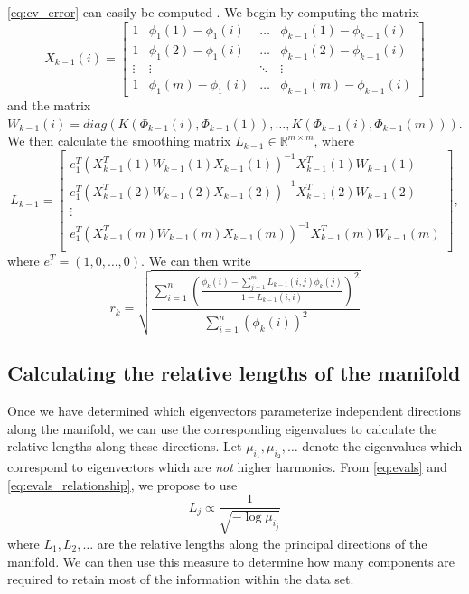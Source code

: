 \documentclass[preprint]{elsarticle}
\begin{document}
\eqref{eq:cv_error} can easily be computed \cite{wasserman2006all}.
%
We begin by computing the matrix
\begin{equation}
X_{k-1}(i) = \begin{bmatrix}
1 & \phi_1(1) - \phi_1(i) & \dots & \phi_{k-1}(1)- \phi_{k-1}(i) \\
1 & \phi_1(2) - \phi_1(i) & \dots & \phi_{k-1}(2)- \phi_{k-1}(i) \\
\vdots & \vdots & \ddots & \vdots \\
1 & \phi_1(m) - \phi_1(i) & \dots & \phi_{k-1}(m)- \phi_{k-1}(i) 
\end{bmatrix}
\end{equation}
%
and the matrix $W_{k-1}(i) = diag \left( K(\Phi_{k-1}(i), \Phi_{k-1}(1)), \dots, K(\Phi_{k-1}(i), \Phi_{k-1}(m)) \right)$.
%
We then calculate the smoothing matrix $L_{k-1} \in \mathbb{R}^{m \times m}$, where 
\begin{equation}
L_{k-1} =
\begin{bmatrix}
e_1^T \left( X_{k-1}^T(1) W_{k-1}(1) X_{k-1}(1) \right) ^{-1} X_{k-1}^T(1) W_{k-1}(1) \\
e_1^T \left( X_{k-1}^T(2) W_{k-1}(2) X_{k-1}(2) \right) ^{-1} X_{k-1}^T(2) W_{k-1}(2) \\
\vdots \\
e_1^T \left( X_{k-1}^T(m) W_{k-1}(m) X_{k-1}(m) \right) ^{-1} X_{k-1}^T(m) W_{k-1}(m) \\
\end{bmatrix},
\end{equation}
%
where $e_1^T = (1, 0, \dots, 0)$. 
%
We can then write
%
\begin{equation} 
r_{k} = \sqrt{ \frac{\sum_{i=1}^n \left( \frac{ \phi_{k} (i) - \sum_{j=1}^m L_{k-1}(i,j) \phi_{k}(j) }{1-L_{k-1}(i,i)} \right)^2} {\sum_{i=1}^n  \left( \phi_{k} (i) \right)^2 }}
\end{equation}

\subsection{Calculating the relative lengths of the manifold}

Once we have determined which eigenvectors parameterize independent directions along the manifold, we can use the corresponding eigenvalues to calculate the relative lengths along these directions. 
%
Let $\mu_{i_1}, \mu_{i_2}, \dots$ denote the eigenvalues which correspond to eigenvectors which are {\em not} higher harmonics. 
%
From \eqref{eq:evals} and \eqref{eq:evals_relationship}, we propose to use
\begin{equation} \label{eq:est_lengths}
L_j \propto \frac{1}{\sqrt{-\log \mu_{i_j}}}
\end{equation}
where $L_1, L_2, \dots$ are the relative lengths along the principal directions of the manifold. 
%
We can then use this measure to determine how many components are required to retain most of the information within the data set. 
\end{document}
